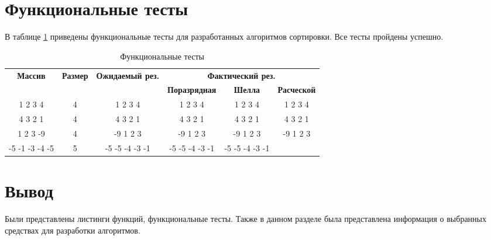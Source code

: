 \clearpage





\clearpage

\section{Функциональные тесты}
В таблице \ref{tab:tests} приведены функциональные тесты для разработанных алгоритмов сортировки. Все тесты пройдены успешно.

\begin{table}[ht]
	\small
	\begin{center}
		\begin{threeparttable}
			\caption{Функциональные тесты}
			\label{tab:tests}
			\begin{tabular}{|c|c|c|c|c|c|}
				\hline
				\bfseries Массив
				& \bfseries Размер
				& \bfseries Ожидаемый рез.
				& \multicolumn{3}{c|}{\bfseries Фактический рез.} \\ \cline{4-6}
				& & & \bfseries Поразрядная & \bfseries Шелла & \bfseries Расческой \\
				\hline
				1 2 3 4  & 4 & 1 2 3 4 & 1 2 3 4 & 1 2 3 4 & 1 2 3 4 \\
				\hline
				4 3 2 1 & 4 & 4 3 2 1 & 4 3 2 1 & 4 3 2 1 & 4 3 2 1 \\
				\hline
				1 2 3 -9 & 4 & -9 1 2 3  & -9 1 2 3 & -9 1 2 3 & -9 1 2 3 \\
				\hline
				-5 -1 -3 -4 -5 & 5 & -5 -5 -4 -3 -1 & -5 -5 -4 -3 -1 & -5 -5 -4 -3 -1 \\
				\hline
			\end{tabular}	
		\end{threeparttable}	
	\end{center}
\end{table}

\section*{Вывод}
Были представлены листинги функций, функциональные тесты.
Также в данном разделе была представлена информация о выбранных средствах для разработки алгоритмов.